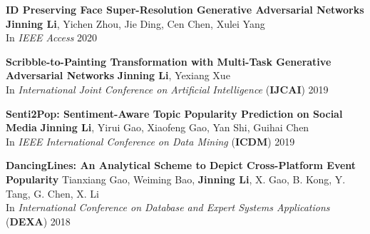 \documentclass[12pt, letterpaper]{article}
\newcommand{\mhead}[1]{\leavevmode\marginpar{\sffamily\footnotesize #1}}
\begin{document}
\textbf{ID Preserving Face Super-Resolution Generative Adversarial Networks}
\href{https://ieeexplore.ieee.org/document/9146819}{}\href{https://github.com/jinningli/IP-FSRGAN}{}
\newline
\footnotesize
\textbf{Jinning Li}, Yichen Zhou, Jie Ding, Cen Chen, Xulei Yang\\
In \emph{IEEE Access} 2020
\small
\vspace{2pt}

\textbf{Scribble-to-Painting Transformation with Multi-Task Generative Adversarial Networks}
\href{https://www.ijcai.org/proceedings/2019/820}{}\href{https://github.com/jinningli/DSP-Net}{}
\newline
\footnotesize
\textbf{Jinning Li}, Yexiang Xue\\
In \emph{International Joint Conference on Artificial Intelligence} (\textbf{IJCAI}) 2019
\small
\vspace{2pt}

\textbf{Senti2Pop: Sentiment-Aware Topic Popularity Prediction on Social Media}
\href{http://jinningli.cn/cv/Senti2Pop.pdf}{}
\newline
\footnotesize
\textbf{Jinning Li}, Yirui Gao, Xiaofeng Gao, Yan Shi, Guihai Chen\\
In \emph{IEEE International Conference on Data Mining} (\textbf{ICDM}) 2019
\small
\vspace{2pt}

\textbf{DancingLines: An Analytical Scheme to Depict Cross-Platform Event Popularity}
\href{http://jinningli.cn/cv/dancinglines.pdf}{}\href{https://github.com/jinningli/dancinglines}{}\newline
\footnotesize
Tianxiang Gao, Weiming Bao, \textbf{Jinning Li}, X. Gao, B. Kong, Y. Tang, G. Chen, X. Li\\
In \emph{International Conference on Database and Expert Systems Applications} (\textbf{DEXA}) 2018
\small

%
\end{document}
